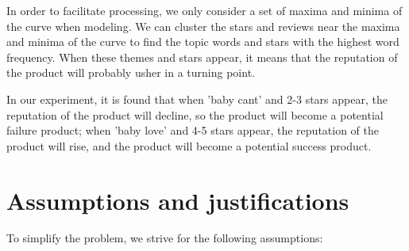 \documentclass{mcmthesis}
\begin{document}
In order to facilitate processing, we only consider a set of maxima and minima of the curve when modeling. We can cluster the stars and reviews near the maxima and minima of the curve to find the topic words and stars with the highest word frequency. When these themes and stars appear, it means that the reputation of the product will probably usher in a turning point.

In our experiment, it is found that when 'baby cant' and 2-3 stars appear, the reputation of the product will decline, so the product will become a potential failure product; when 'baby love' and 4-5 stars appear, the reputation of the product will rise, and the product will become a potential success product.
\section{Assumptions and justifications}
To simplify the problem, we strive for the following assumptions:
\end{document}
